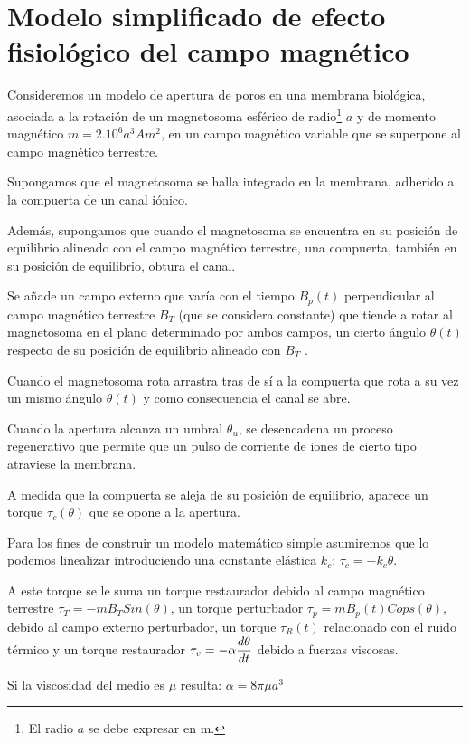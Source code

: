 \section{Modelo simplificado de efecto fisiológico del campo magnético}

Consideremos un modelo de apertura de poros en una membrana biológica, asociada a la rotación de un magnetosoma esférico de radio\footnote{El radio $a$ se debe expresar en m.} $a$ y de momento magnético $m=2.10^{6} a^{3} Am^{2}$, en un campo magnético variable que se superpone al campo magnético terrestre.

Supongamos que el magnetosoma se halla integrado en la membrana, adherido a la compuerta de un canal iónico.

Además, supongamos que cuando el magnetosoma se encuentra en su posición de equilibrio alineado con el campo magnético terrestre, una compuerta, también en su posición de equilibrio, obtura el canal.

Se añade un campo externo que varía con el tiempo $B_{p}(t)$ perpendicular al campo magnético terrestre $B_{T}$ (que se considera constante) que tiende a rotar al magnetosoma en el plano determinado por ambos campos, un cierto ángulo $\theta(t)$ respecto de su posición de equilibrio alineado con $B_{T}$ .

Cuando el magnetosoma rota arrastra tras de sí a la compuerta que rota a su vez un mismo ángulo $\theta(t)$ y como consecuencia el canal se abre.

Cuando la apertura alcanza un umbral $\theta_{u}$, se desencadena un proceso regenerativo que permite que un pulso de corriente de iones de cierto tipo atraviese la membrana.

A medida que la compuerta se aleja de su posición de equilibrio, aparece un torque $\tau_{c}(\theta)$ que se opone a la apertura.

Para los fines de construir un modelo matemático simple asumiremos que lo podemos linealizar introduciendo una constante elástica $k_{c}$: $\tau_{c}=-k_{c}\theta$.

A este torque se le suma un torque restaurador debido al campo magnético terrestre $\tau_{T}=-mB_{T}Sin(\theta)$, un torque perturbador $\tau_{p}=mB_{p}(t)Cops(\theta)$, debido al campo externo perturbador, un torque $\tau_{R}(t)$ relacionado con el ruido térmico y un torque restaurador $\tau_{v}=-\alpha\dfrac{d\theta}{dt}$ debido a fuerzas viscosas.

Si la viscosidad del medio es $\mu$ resulta: $\alpha=8\pi\mu a^{3}$

